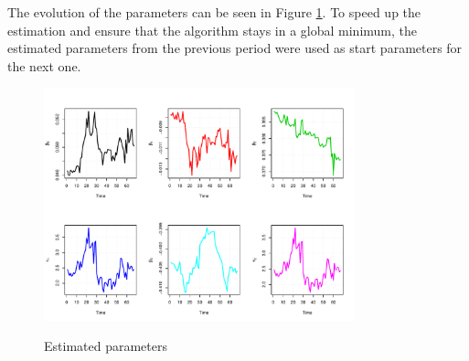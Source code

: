 The evolution of the parameters can be seen in Figure \ref{fig:paramdevel}. To speed up the estimation and ensure that the algorithm stays in a global minimum, the estimated parameters from the previous period were used as start parameters for the next one.

\begin{figure}[htb]
  \begin{center}
  \caption{Estimated parameters}
\includegraphics[width=0.8\textwidth]{paramdevel}
\label{fig:paramdevel}
\end{center}
\end{figure}



